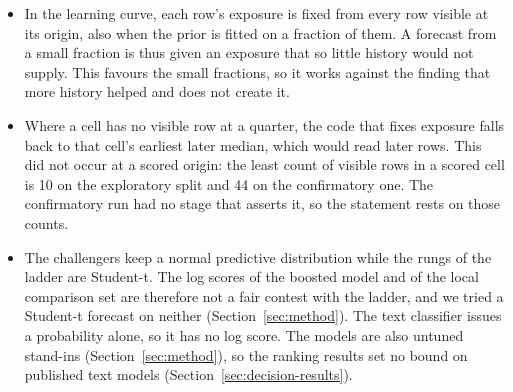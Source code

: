 \begin{itemize}
\item In the learning curve, each row's exposure is fixed from every row visible at its origin, also when the prior is fitted on a fraction of them. A forecast from a small fraction is thus given an exposure that so little history would not supply. This favours the small fractions, so it works against the finding that more history helped and does not create it.
\item Where a cell has no visible row at a quarter, the code that fixes exposure falls back to that cell's earliest later median, which would read later rows. This did not occur at a scored origin: the least count of visible rows in a scored cell is 10 on the exploratory split and 44 on the confirmatory one. The confirmatory run had no stage that asserts it, so the statement rests on those counts.
\item The challengers keep a normal predictive distribution while the rungs of the ladder are Student-t. The log scores of the boosted model and of the local comparison set are therefore not a fair contest with the ladder, and we tried a Student-t forecast on neither (Section~\ref{sec:method}). The text classifier issues a probability alone, so it has no log score. The models are also untuned stand-ins (Section~\ref{sec:method}), so the ranking results set no bound on published text models (Section~\ref{sec:decision-results}).

\end{itemize}
